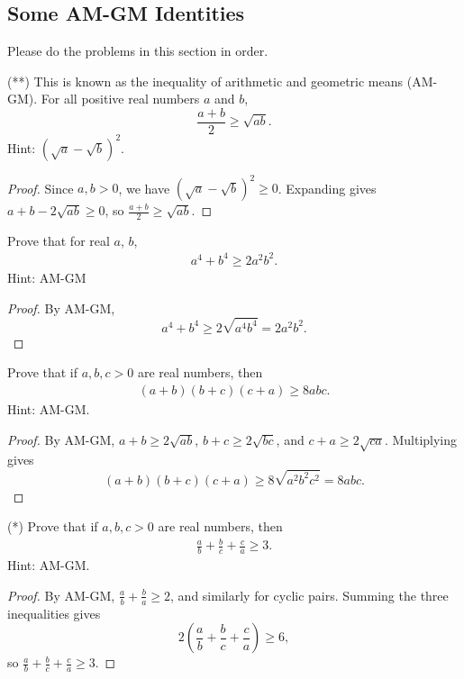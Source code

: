 \documentclass[12pt]{article}
\begin{document}
\subsection*{Some AM-GM Identities}

Please do the problems in this section in order.

\begin{problem}
(**) This is known as the inequality of arithmetic and geometric means (AM-GM). For all positive real numbers $a$ and $b$,
\[
\frac{a+b}{2}\ge \sqrt{ab}.
\]
Hint: $(\sqrt{a} - \sqrt{b})^2$.
\begin{proof}
Since $a,b>0$, we have $(\sqrt a-\sqrt b)^2\ge 0$. Expanding gives $a+b-2\sqrt{ab}\ge 0$, so $\frac{a+b}{2}\ge \sqrt{ab}$.
\end{proof}
\end{problem}

\begin{problem}
Prove that for real $a$, $b$,
\begin{align*}
    a^4 + b^4 \geq 2a^2b^2.
\end{align*}
Hint: AM-GM
\begin{proof}
By AM-GM,
\[
a^4+b^4\ge 2\sqrt{a^4b^4}=2a^2b^2.
\]
\end{proof}
\end{problem}

\begin{problem}
Prove that if $a,b,c > 0$ are real numbers, then 
\begin{align*}
    (a + b)(b + c)(c + a) \geq 8abc.
\end{align*}
Hint: AM-GM.
\begin{proof}
By AM-GM, $a+b\ge 2\sqrt{ab}$, $b+c\ge 2\sqrt{bc}$, and $c+a\ge 2\sqrt{ca}$. Multiplying gives
\[
(a+b)(b+c)(c+a)\ge 8\sqrt{a^2b^2c^2}=8abc.
\]
\end{proof}
\end{problem}

\begin{problem}
(*) Prove that if $a,b,c > 0$ are real numbers, then 
\begin{align*}
    \frac{a}{b} + \frac{b}{c} + \frac{c}{a} \geq 3.
\end{align*}
Hint: AM-GM.
\begin{proof}
By AM-GM, $\frac{a}{b}+\frac{b}{a}\ge 2$, and similarly for cyclic pairs. Summing the three inequalities gives
\[
2\left(\frac{a}{b}+\frac{b}{c}+\frac{c}{a}\right)\ge 6,
\]
so $\frac{a}{b}+\frac{b}{c}+\frac{c}{a}\ge 3$.
\end{proof}
\end{problem}  
\end{document}
